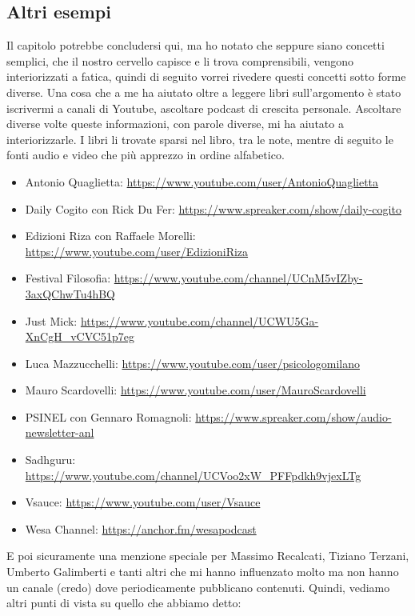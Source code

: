 \documentclass[12pt]{book} %
\begin{document}
\bigskip


\bigskip

\subsection{Altri esempi}
Il capitolo potrebbe concludersi qui, ma ho notato che seppure siano concetti semplici, che il nostro cervello capisce e
li trova comprensibili, vengono interiorizzati a fatica, quindi di seguito vorrei rivedere questi concetti sotto forme
diverse. Una cosa che a me ha aiutato oltre a leggere libri sull'argomento è stato iscrivermi a
canali di Youtube, ascoltare podcast di crescita personale. Ascoltare diverse volte queste informazioni, con parole
diverse, mi ha aiutato a interiorizzarle. I libri li trovate sparsi nel libro, tra le note, mentre di seguito le fonti
audio e video che più apprezzo in ordine alfabetico.

\begin{itemize}
\item Antonio Quaglietta: \protect\url{https://www.youtube.com/user/AntonioQuaglietta} 
\item Daily Cogito con Rick Du Fer: \protect\url{https://www.spreaker.com/show/daily-cogito} 
\item Edizioni Riza con Raffaele Morelli: \protect\url{https://www.youtube.com/user/EdizioniRiza}
\item Festival Filosofia: \protect\url{https://www.youtube.com/channel/UCnM5vIZby-3axQChwTu4hBQ} 
\item Just Mick: \protect\url{https://www.youtube.com/channel/UCWU5Ga-XnCgH\_vCVC51p7eg}
\item Luca Mazzucchelli: \protect\url{https://www.youtube.com/user/psicologomilano} 
\item Mauro Scardovelli: \protect\url{https://www.youtube.com/user/MauroScardovelli} 
\item PSINEL con Gennaro Romagnoli: \protect\url{https://www.spreaker.com/show/audio-newsletter-anl} 
\item Sadhguru: \protect\url{https://www.youtube.com/channel/UCVoo2xW\_PFFpdkh9vjexLTg} 
\item Vsauce: \protect\url{https://www.youtube.com/user/Vsauce} 
\item Wesa Channel: \protect\url{https://anchor.fm/wesapodcast} 
\end{itemize}
E poi sicuramente una menzione speciale per Massimo Recalcati, Tiziano Terzani, Umberto Galimberti e tanti altri che mi
hanno influenzato molto ma non hanno un canale (credo) dove periodicamente pubblicano contenuti. Quindi, vediamo altri
punti di vista su quello che abbiamo detto:
\end{document}
